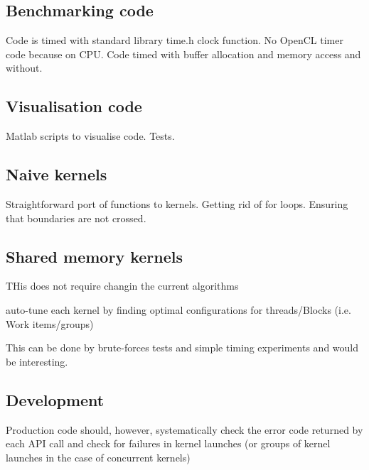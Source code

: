 \subsection{Benchmarking code}
Code is timed with standard library time.h clock function.
No OpenCL timer code because on CPU. Code timed with buffer allocation and memory access and without.

\subsection{Visualisation code}
Matlab scripts to visualise code. Tests.

\subsection{Naive kernels}
Straightforward port of functions to kernels. Getting rid of for loops. Ensuring that boundaries are not crossed.


\subsection{Shared memory kernels}

THis does not require changin the current algorithms

auto-tune each kernel by finding optimal
configurations for threads/Blocks (i.e. Work items/groups) 

 This can be done by brute-forces tests and simple timing
experiments and would be interesting.

\subsection{Development}
Production code should, however, systematically check the error code returned by each API call and check for failures in kernel launches (or groups of kernel launches in the case of concurrent kernels) 
